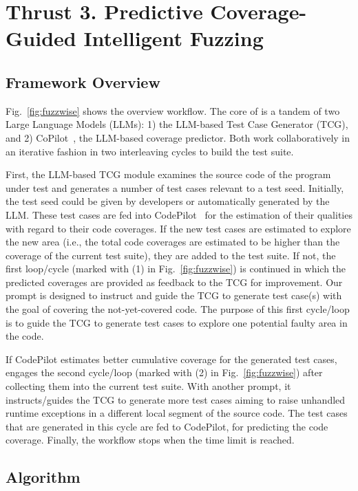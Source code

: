 \section{Thrust 3. Predictive Coverage-Guided Intelligent Fuzzing}
\label{sec:thrust3}

\subsection{Framework Overview}
\label{sec:framework}

Fig.~\ref{fig:fuzzwise} shows the overview workflow. The core of {\tool} is a tandem of two Large Language
Models (LLMs): 1) the LLM-based Test Case Generator (TCG), and 2)
CoPilot~\cite{forge24}, the LLM-based coverage predictor. Both
work collaboratively in an iterative fashion in two interleaving
cycles to build the test suite.

First, the LLM-based TCG module examines the source code of the program under
test and generates a number of test cases relevant to a test seed. Initially, the test seed could be given by developers or
automatically generated by the LLM. These test cases are
fed into CodePilot~\cite{forge24} for the estimation of their qualities
with regard to their code coverages. If the new test cases are
estimated to explore the new area (i.e., the total code coverages are
estimated to be higher than the coverage of the current test
suite), they are added to the test
suite. If not, the first loop/cycle (marked with (1) in
Fig.~\ref{fig:fuzzwise}) is continued in which the predicted coverages
are provided as feedback to the TCG for improvement. Our
prompt is designed to instruct and guide the TCG to generate test case(s)
with the goal of covering the not-yet-covered code. The purpose
of this first cycle/loop is to guide the TCG to generate test cases
to explore one potential faulty area in the code.

If CodePilot estimates better cumulative coverage for the
generated test cases, {\tool} engages the second cycle/loop (marked with (2) in
Fig.~\ref{fig:fuzzwise}) after collecting them into the current test suite. With another prompt, it instructs/guides the TCG
to generate more test cases aiming to raise unhandled runtime exceptions
in a different local segment of the source code. The test cases that are
generated in this cycle are fed to CodePilot, for predicting the code coverage.
Finally, the workflow stops when the
time limit is reached.

\subsection{{\tool} Algorithm}




